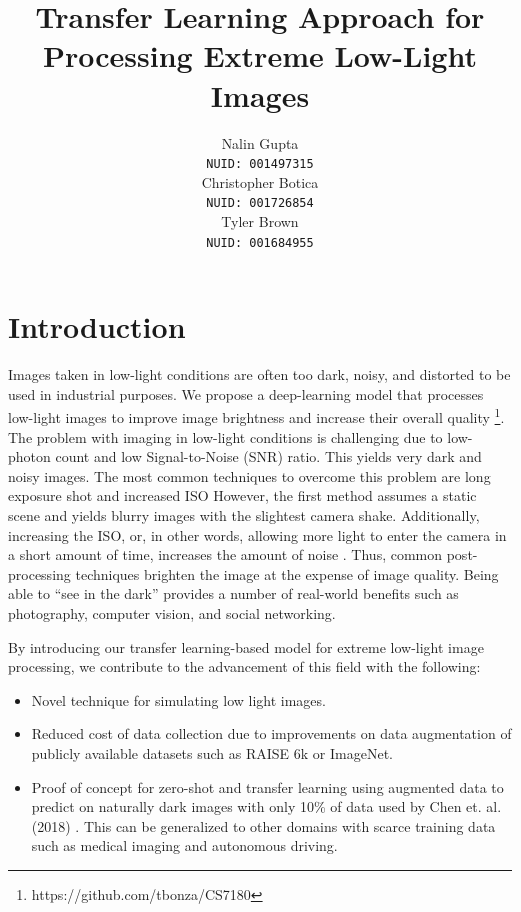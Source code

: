 \documentclass{article}
\title{Transfer Learning Approach for Processing Extreme Low-Light Images}
\author{%
  Nalin Gupta \\
  \texttt{NUID: 001497315} \\
  \And
  Christopher Botica\\
  \texttt{NUID: 001726854} \\
  \And
  Tyler Brown\\
  \texttt{NUID: 001684955} \\
}
\begin{document}

\maketitle

\section{Introduction}

Images taken in low-light conditions are often too dark, noisy, and
distorted to be used in industrial purposes. We propose a deep-learning model that processes low-light images to improve image brightness and increase their overall quality \footnote{https://github.com/tbonza/CS7180}. The problem with imaging in low-light conditions is challenging due to low-photon count and low Signal-to-Noise (SNR) ratio. This yields very dark and noisy images. The most common techniques to overcome this problem are long exposure shot and increased ISO However, the first method assumes a static scene and yields blurry images with the slightest camera shake. Additionally, increasing the ISO, or, in other words, allowing more light to enter the camera in a short amount of time, increases the amount of noise \cite{chen2018learning}. Thus, common post-processing techniques brighten the image at the expense of image quality. Being able to ``see in the dark'' provides a number of real-world benefits such as photography, computer vision, and social networking. 

By introducing our transfer learning-based model for extreme low-light image processing, we contribute to the advancement of this field with the following:

%
%

\begin{itemize}
    \item Novel technique for simulating low light images.
    \item Reduced cost of data collection due to improvements on data augmentation of publicly available datasets such as RAISE 6k or ImageNet.
    \item Proof of concept for zero-shot and transfer learning using augmented data to predict on naturally dark images with only 10\% of data used by Chen et. al. (2018) \cite{chen2018learning}. This can be generalized to other domains with scarce training data such as medical imaging and autonomous driving. 
\end{itemize}
\end{document}
